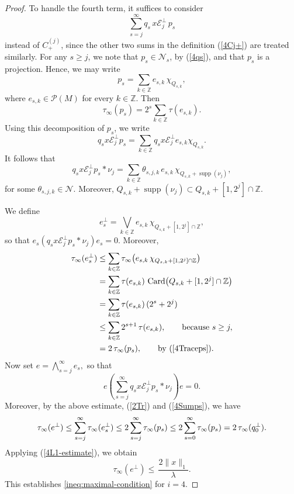\documentclass[12pt]{amsart}
\newcommand{\Zdb}{\mbox{$\mathbb{Z}$}}
\newcommand{\N}{\mbox{${\mathcal N}$}}
\renewcommand{\P}{\mbox{${\mathcal P}$}}
\theoremstyle{remark}
\theoremstyle{definition}
\numberwithin{equation}{section}
\begin{document}
\begin{proof}
To handle the fourth term,
it suffices to consider
$$
\sum_{s=j}^{\infty} q_s\, x \mathcal{E}_j^\perp\,p_s
$$
instead of $C_+^{(j)}$, since the other two sums in the definition (\ref{4Cj+}) 
are treated similarly. 
For any $s\ge j$, we note that 
$p_s\in\mathcal N_s$, by (\ref{4qs}), and that  
$p_s$ is a projection. Hence, we may write 
$$
p_s
=\sum_{k\in\mathbb Z}
e_{s,k}\,\chi_{Q_{s,k}},
$$
where $e_{s,k}\in \P(M)$ for every $k\in\Zdb$.
Then
\begin{equation}\label{4Traceps}
\tau_\infty(p_s) = 2^s\sum_{k\in\mathbb Z} \tau(e_{s,k}).
\end{equation}
Using this decomposition of $p_s$, we write
\[
q_s x\mathcal{E}_j^\perp p_s
=
\sum_{k\in\mathbb Z}
q_s x \mathcal{E}_j^\perp
e_{s,k}
\chi_{Q_{s,k}}.
\]
It follows that
\[
q_s x\mathcal{E}_j^\perp p_s*\nu_j
=
\sum_{k\in\mathbb Z}
\theta_{s,j,k}\,
e_{s,k}\,
\chi_{Q_{s,k}+\operatorname{supp}(\nu_j)},
\]
for some
\(\theta_{s,j,k}\in\N.
\) Moreover, 
\(Q_{s,k}
+\operatorname{supp}(\nu_j)
\subset
Q_{s,k}
+[1,2^j]\cap\Zdb.\) 



We define
\[
e_s^\perp
=
\bigvee_{k\in\mathbb Z}
e_{s,k}\,
\chi_{Q_{s,k}+[1,2^j]\cap{\mathbb Z}},
\]
so that
\(e_s\left(q_s x\mathcal{E}_j^{\perp}p_s * \nu_j\right)e_s = 0.
\)
Moreover,
\begin{align*}
\tau_\infty(e_s^{\perp})
&\le \sum_{k\in\mathbb{Z}}
\tau_\infty\!\left(e_{s,k}\,
\chi_{Q_{s,k}+[1,2^j]\cap {\mathbb Z}}\right) \\
&=
\sum_{k\in\mathbb{Z}}
\tau(e_{s,k})\,
\operatorname{Card}\!\left(Q_{s,k}+[1,2^j]\cap\Zdb\right) \\
&=
\sum_{k\in\mathbb{Z}}
\tau(e_{s,k})\,
(2^s+2^j) \\
&\le
\sum_{k\in\mathbb{Z}}
2^{s+1}\,\tau(e_{s,k}),
\qquad \text{because } s\ge j,\\
&=
2\,\tau_\infty(p_s),\qquad \text{by (\ref{4Traceps})}.
\end{align*}
Now set \(e=\bigwedge_{s=j}^{\infty}e_s,\) so that
$$
e\left(
\sum_{s=j}^{\infty}
q_s x \mathcal{E}_j^{\perp}p_s*\nu_j
\right)e=0.
$$ 
Moreover, by the above estimate, (\ref{2Tr}) and (\ref{4Sumps}), we have
$$
\tau_\infty(e^{\perp})\le
\sum_{s=j}^{\infty}
\tau_\infty(e_s^{\perp}) 
\le
2\sum_{s=j}^{\infty}
\tau_\infty(p_s) 
\le
2\sum_{s=0}^{\infty}
\tau_\infty(p_s) \\
=
2\,\tau_\infty(q_0^\perp).
$$ 
Applying (\ref{4L1-estimate}), we obtain
$$
\tau_\infty (e^{\perp})\le\,\frac{2\|x\|_1}{\lambda}.
$$
This establishes \eqref{ineq:maximal-condition} for $i=4$.







\end{proof}
\end{document}
